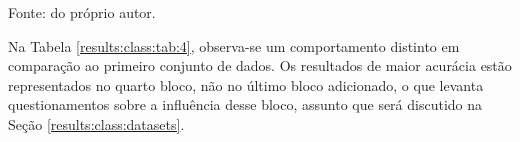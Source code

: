 \begin{table}[H]
    \centering
    \caption{Resultados por fase de \textit{fine-tuning} de VGG-16 aplicada no conjunto de dados \textit{Food}-101.}
    \label{results:class:tab:4}

    \vspace*{1 cm}
    Fonte: do próprio autor.
\end{table}

Na Tabela \ref{results:class:tab:4}, observa-se um comportamento distinto em comparação ao primeiro conjunto de dados. Os resultados de maior acurácia estão representados no quarto bloco, não no último bloco adicionado, o que levanta questionamentos sobre a influência desse bloco, assunto que será discutido na Seção \ref{results:class:datasets}.

